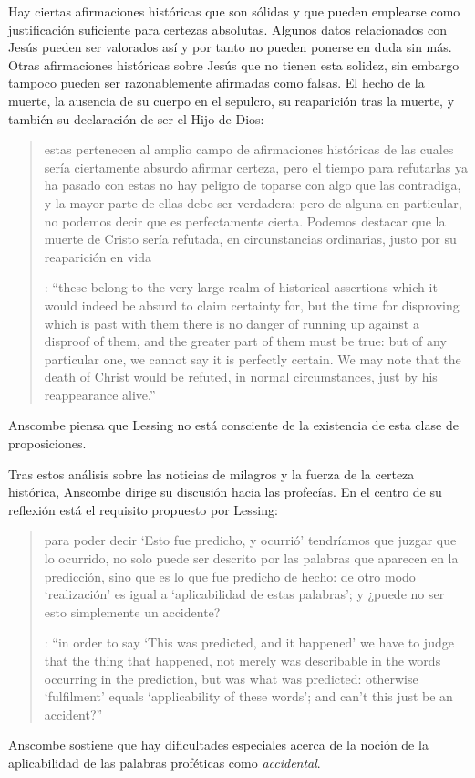 Hay ciertas afirmaciones históricas que son sólidas y que pueden emplearse como justificación suficiente para certezas absolutas. Algunos datos relacionados con Jesús pueden ser valorados así y por tanto no pueden ponerse en duda sin más. Otras afirmaciones históricas sobre Jesús que no tienen esta solidez, sin embargo tampoco pueden ser razonablemente afirmadas como falsas. El hecho de la muerte, la ausencia de su cuerpo en el sepulcro, su reaparición tras la muerte, y también su declaración de ser el Hijo de Dios: \blockquote[{\cite[28]{anscombe2008faith:prophandmi}}: \enquote{these belong to the very large realm of historical assertions which it would indeed be absurd to claim certainty for, but the time for disproving which is past \textelp{} with them there is no danger of running up against a disproof of them, and the greater part of them must be true: but of any particular one, we cannot say it is perfectly certain. We may note that the death of Christ would be refuted, in normal circumstances, just by his reappearance alive.}]{estas pertenecen al amplio campo de afirmaciones históricas de las cuales sería ciertamente absurdo afirmar certeza, pero el tiempo para refutarlas ya ha pasado \textelp{} con estas no hay peligro de toparse con algo que las contradiga, y la mayor parte de ellas debe ser verdadera: pero de alguna en particular, no podemos decir que es perfectamente cierta. Podemos destacar que la muerte de Cristo sería refutada, en circunstancias ordinarias, justo por su reaparición en vida}. Anscombe piensa que Lessing no está consciente de la existencia de esta clase de proposiciones.

Tras estos análisis sobre las noticias de milagros y la fuerza de la certeza histórica, Anscombe dirige su discusión hacia las profecías. En el centro de su reflexión está el requisito propuesto por Lessing: \blockquote[{\cite[29]{anscombe2008faith:prophandmi}}: \enquote{in order to say `This was predicted, and it happened' we have to judge that the thing that happened, not merely was describable in the words occurring in the prediction, but was what was predicted: otherwise `fulfilment' equals `applicability of these words'; and can't this just be an accident?}]{para poder decir `Esto fue predicho, y ocurrió' tendríamos que juzgar que lo ocurrido, no solo puede ser descrito por las palabras que aparecen en la predicción, sino que es lo que fue predicho de hecho: de otro modo `realización' es igual a `aplicabilidad de estas palabras'; y ¿puede no ser esto simplemente un accidente?} Anscombe sostiene que hay dificultades especiales acerca de la noción de la aplicabilidad de las palabras proféticas como \emph{accidental}.

